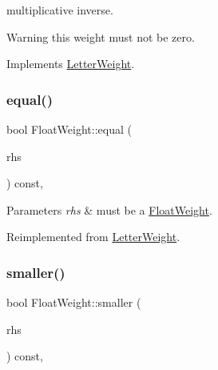 multiplicative inverse. 

\begin{DoxyWarning}{Warning}
this weight must not be zero. 
\end{DoxyWarning}


Implements \mbox{\hyperlink{classLetterWeight_a76a013deb82c8c1511cb6a68e5a06218}{Letter\+Weight}}.

\mbox{\label{group__weight_gaaa895d17971bdd11c3ecddb9d701ac0a}} 
\subsubsection{\texorpdfstring{equal()}{equal()}\hspace{0.1cm}{\footnotesize\ttfamily [2/4]}}
{\footnotesize\ttfamily bool Float\+Weight\+::equal (\begin{DoxyParamCaption}\item[{const \mbox{\hyperlink{classLetterWeight}{Letter\+Weight}} $\ast$}]{rhs }\end{DoxyParamCaption}) const\hspace{0.3cm}{\ttfamily [protected]}, {\ttfamily [virtual]}}


\begin{DoxyParams}{Parameters}
{\em rhs} & must be a \mbox{\hyperlink{classFloatWeight}{Float\+Weight}}. \\
\hline
\end{DoxyParams}


Reimplemented from \mbox{\hyperlink{group__weight_gaf00322921db3c5212f8d5ca63081d689}{Letter\+Weight}}.

\mbox{\label{group__weight_ga89e27d308aeaadbc11621ae9a6e839b3}} 
\subsubsection{\texorpdfstring{smaller()}{smaller()}\hspace{0.1cm}{\footnotesize\ttfamily [2/4]}}
{\footnotesize\ttfamily bool Float\+Weight\+::smaller (\begin{DoxyParamCaption}\item[{const \mbox{\hyperlink{classLetterWeight}{Letter\+Weight}} $\ast$}]{rhs }\end{DoxyParamCaption}) const\hspace{0.3cm}{\ttfamily [protected]}, {\ttfamily [virtual]}}


